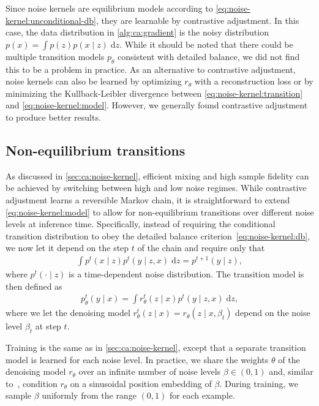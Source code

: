 \documentclass[10pt,twocolumn,letterpaper]{article}
\begin{document}
Since noise kernels are equilibrium models according to \cref{eq:noise-kernel:unconditional-db}, they are learnable by contrastive adjustment.
In this case, the data distribution in \cref{alg:ca:gradient} is the noisy distribution $p(x) = \int p(z)p(x \mid z) \; \mathrm{d}z$.
While it should be noted that there could be multiple transition models $p_{\theta}$ consistent with detailed balance, we did not find this to be a problem in practice.
As an alternative to contrastive adjustment, noise kernels can also be learned by optimizing $r_{\theta}$ with a reconstruction loss or by minimizing the Kullback-Leibler divergence between \cref{eq:noise-kernel:transition} and \cref{eq:noise-kernel:model}.
However, we generally found contrastive adjustment to produce better results.


\subsection{Non-equilibrium transitions}\label{sec:ca:non-equilibrium}

As discussed in \cref{sec:ca:noise-kernel}, efficient mixing and high sample fidelity can be achieved by switching between high and low noise regimes.
While contrastive adjustment learns a reversible Markov chain, it is straightforward to extend \cref{eq:noise-kernel:model} to allow for non-equilibrium transitions over different noise levels at inference time.
Specifically, instead of requiring the conditional transition distribution to obey the detailed balance criterion~\eqref{eq:noise-kernel:db}, we now let it depend on the step $t$ of the chain and require only that
\begin{align}
  \int p^{t}(x \mid z) p^{t}(y \mid z, x) \; \mathrm{d}z
  = p^{t+1}(y \mid z),
  \label{eq:noise-kernel:non-equilibrium-condition}
\end{align}
where $p^{t}(\cdot \mid z)$ is a time-dependent noise distribution.
The transition model is then defined as
\begin{align}
  p^{t}_{\theta}(y \mid x) = \int r^{t}_{\theta}(z \mid x) p^{t}(y \mid z, x) \; \mathrm{d}z,
\end{align}
where we let the denoising model $r^{t}_{\theta}(z \mid x) = r_{\theta}(z \mid x, \beta_{t})$ depend on the noise level $\beta_{t}$ at step $t$.

Training is the same as in \cref{sec:ca:noise-kernel}, except that a separate transition model is learned for each noise level.
In practice, we share the weights $\theta$ of the denoising model $r_{\theta}$ over an infinite number of noise levels $\beta \in (0, 1)$ and, similar to~\cite{ho2020denoising}, condition $r_{\theta}$ on a sinusoidal position embedding of $\beta$.
During training, we sample $\beta$ uniformly from the range $(0, 1)$ for each example.
\end{document}
